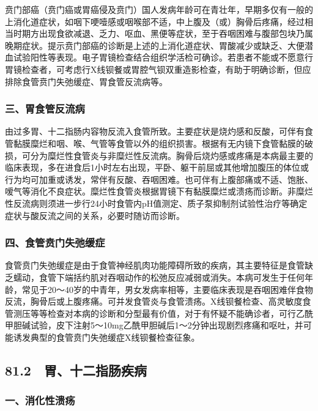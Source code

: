贲门部癌（贲门癌或胃癌侵及贲门）国人发病年龄可在青壮年，早期多仅有一般的上消化道症状，如咽下哽噎感或咽喉部不适，中上腹及（或）胸骨后疼痛，经过相当时期方出现食欲减退、乏力、呕血、黑便等症状，至于吞咽困难与腹部包块乃属晚期症状。提示贲门部癌的诊断是上述的上消化道症状、胃酸减少或缺乏、大便潜血试验阳性等表现。电子胃镜检查结合组织学活检可确诊。若患者不能或不愿意行胃镜检查者，可考虑行X线钡餐或胃腔气钡双重造影检查，有助于明确诊断，但应排除食管贲门失弛缓症、胃食管反流病等。

\subsubsection{三、胃食管反流病}

由过多胃、十二指肠内容物反流入食管所致。主要症状是烧灼感和反酸，可伴有食管黏膜糜烂和咽、喉、气管等食管以外的组织损害。根据有无内镜下食管黏膜的破损，可分为糜烂性食管炎与非糜烂性反流病。胸骨后烧灼感或疼痛是本病最主要的临床表现，多在进食后1小时左右出现，平卧、躯干前屈或其他增加腹压的体位或行为均可加重或诱发，常伴有反酸、吞咽困难。也可伴有上腹部痛或不适、饱胀、嗳气等消化不良症状。糜烂性食管炎根据胃镜下有黏膜糜烂或溃疡而诊断。非糜烂性反流病则须进一步行24小时食管内pH值测定、质子泵抑制剂试验性治疗等确定症状与酸反流之间的关系，必要时随访而诊断。

\subsubsection{四、食管贲门失弛缓症}

食管贲门失弛缓症是由于食管神经肌肉功能障碍所致的疾病，其主要特征是食管缺乏蠕动，食管下端括约肌对吞咽动作的松弛反应减弱或消失。本病可发生于任何年龄，常见于20～40岁的中青年，男女发病率相等，主要临床表现是吞咽困难伴食物反流，胸骨后或上腹疼痛。可并发食管炎与食管溃疡。X线钡餐检查、高灵敏度食管测压等等检查对本病的诊断和分型最有价值，对于有怀疑不能确诊者，可行乙酰甲胆碱试验，皮下注射5～10mg乙酰甲胆碱后1～2分钟出现剧烈疼痛和呕吐，并可能诱发典型的食管贲门失弛缓症X线钡餐检查征象。

\subsection{81.2　胃、十二指肠疾病}

\subsubsection{一、消化性溃疡}

